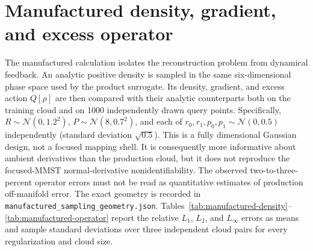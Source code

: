 \section{Manufactured density, gradient, and excess operator}
\label{sec:results-manufactured}

The manufactured calculation isolates the reconstruction problem from
dynamical feedback. An analytic positive density is sampled in the same
six-dimensional phase space used by the product surrogate. Its density,
gradient, and excess action \(Q[\rho]\) are then compared with their analytic
counterparts both on the training cloud and on 1000 independently drawn query
points. Specifically,
\(R\sim\mathcal N(0,1.2^2)\), \(P\sim\mathcal N(8,0.7^2)\), and each of
\(r_0,r_1,p_0,p_1\sim\mathcal N(0,0.5)\) independently (standard deviation
\(\sqrt{0.5}\)). This is a fully dimensional Gaussian design, not a focused mapping shell.
It is consequently more informative about ambient derivatives
than the production cloud, but it does not reproduce the focused-MMST
normal-derivative nonidentifiability. The observed two-to-three-percent
operator errors must not be read as quantitative estimates of production
off-manifold error. The exact geometry is recorded in
\texttt{manufactured\_sampling\_geometry.json}.
Tables~\ref{tab:manufactured-density}--\ref{tab:manufactured-operator}
report the relative \(L_1\), \(L_2\), and \(L_\infty\) errors as means and
sample standard deviations over three independent cloud pairs for every
regularization and cloud size.

